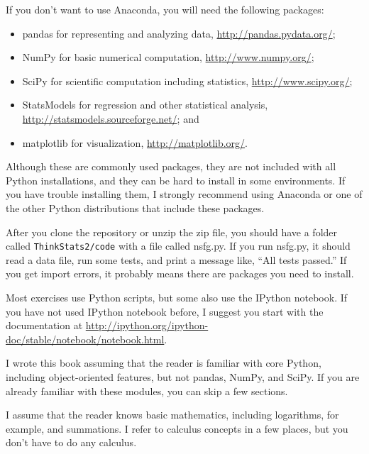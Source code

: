 \documentclass[12pt]{book}
\theoremstyle{exercise}
\begin{document}
If you don't want to use Anaconda, you will need the following
packages:

\begin{itemize}

\item pandas for representing and analyzing data,
  \url{http://pandas.pydata.org/};%

\item NumPy for basic numerical computation, \url{http://www.numpy.org/};%

\item SciPy for scientific computation including statistics,
  \url{http://www.scipy.org/};%

\item StatsModels for regression and other statistical analysis,
\url{http://statsmodels.sourceforge.net/}; and%

\item matplotlib for visualization, \url{http://matplotlib.org/}.%

\end{itemize}

Although these are commonly used packages, they are not included with
all Python installations, and they can be hard to install in some
environments.  If you have trouble installing them, I strongly
recommend using Anaconda or one of the other Python distributions
that include these packages.%

After you clone the repository or unzip the zip file, you should have
a folder called {\tt ThinkStats2/code} with a file called {nsfg.py}.
If you run {nsfg.py}, it should read a data file, run some tests, and print a
message like, ``All tests passed.''  If you get import errors, it
probably means there are packages you need to install.

Most exercises use Python scripts, but some also use the IPython
notebook.  If you have not used IPython notebook before, I suggest
you start with the documentation at
\url{http://ipython.org/ipython-doc/stable/notebook/notebook.html}.%

I wrote this book assuming that the reader is familiar with core Python,
including object-oriented features, but not pandas,
NumPy, and SciPy.  If you are already familiar with these modules, you
can skip a few sections.

I assume that the reader knows basic mathematics, including
logarithms, for example, and summations.  I refer to calculus concepts
in a few places, but you don't have to do any calculus.
\end{document}
